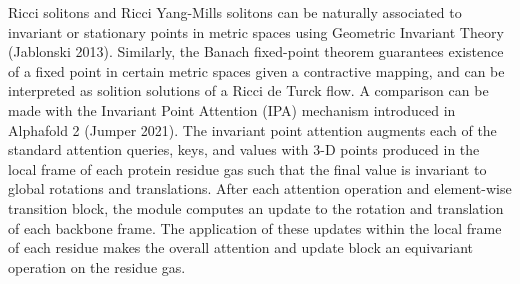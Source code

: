 \documentclass{article}
\begin{document}
    Ricci solitons and Ricci Yang-Mills solitons can be naturally associated to invariant or stationary points in metric spaces using Geometric Invariant Theory (Jablonski 2013).
    Similarly, the Banach fixed-point theorem guarantees existence of a fixed point in certain metric spaces given a contractive mapping, and can be interpreted as solition solutions of a Ricci de Turck flow. A comparison can be made with the Invariant Point Attention (IPA) mechanism introduced in Alphafold 2 (Jumper 2021). The invariant point attention augments each of the standard attention queries, keys, and values with 3-D points produced in the local frame of each protein residue gas such that the final value is invariant to global rotations and translations. 
    After each attention operation and element-wise transition block, the module computes an update to the rotation and translation of each backbone frame. 
    The application of these updates within the local frame of each residue makes the overall attention and update block an equivariant operation on the residue gas.
    

    
    
\end{document}

